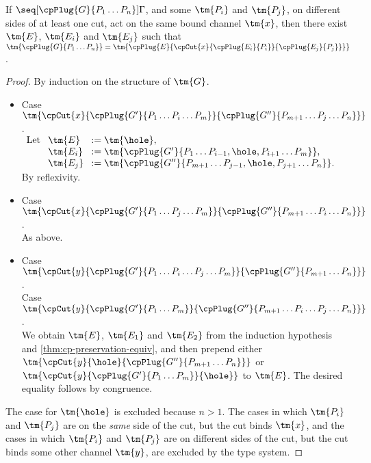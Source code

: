 \begin{lemma}\label{lem:cp-progress-beta}
  If $\seq[{ \cpPlug{G}{P_1 \dots P_n} }]{ \Gamma }$, and some $\tm{P_i}$ and
  $\tm{P_j}$, on different sides of at least one cut, act on the same bound
  channel $\tm{x}$, then there exist $\tm{E}$, $\tm{E_i}$ and $\tm{E_j}$ such that 
  \(
  \tm{\cpPlug{G}{P_1 \dots P_n}} =
  \tm{\cpPlug{E}{\cpCut{x}{\cpPlug{E_i}{P_i}}{\cpPlug{E_j}{P_j}}}}
  \).
\end{lemma}
\begin{proof}
  By induction on the structure of $\tm{G}$.
  \begin{itemize}
  \item
    Case $\tm{\cpCut{x}{\cpPlug{G'}{P_1\dots P_i\dots P_m}}{\cpPlug{G''}{P_{m+1}\dots P_j\dots P_n}}}$. 
    \\
    \(
    \arraycolsep=4pt
    \begin{array}[t]{lll}
      \text{Let}& \tm{E}   &:= \tm{\hole}, \\
                & \tm{E_i} &:= \tm{\cpPlug{G'}{P_1\dots P_{i-1},\hole,P_{i+1}\dots P_m}}, \\
                & \tm{E_j} &:= \tm{\cpPlug{G''}{P_{m+1}\dots P_{j-1},\hole,P_{j+1}\dots P_n}}.
    \end{array}
    \)
    \\[1ex]
    By reflexivity.
  \item
    Case $\tm{\cpCut{x}{\cpPlug{G'}{P_1\dots P_j\dots P_m}}{\cpPlug{G''}{P_{m+1}\dots P_i\dots P_n}}}$.
    \\
    As above.
  \item
    Case $\tm{\cpCut{y}{\cpPlug{G'}{P_1\dots P_i\dots P_j\dots P_m}}{\cpPlug{G''}{P_{m+1}\dots P_n}}}$. \\
    Case $\tm{\cpCut{y}{\cpPlug{G'}{P_1\dots P_m}}{\cpPlug{G''}{P_{m+1}\dots P_i\dots P_j\dots P_n}}}$.
    \\
    We obtain $\tm{E}$, $\tm{E_1}$ and $\tm{E_2}$ from the induction hypothesis and
    \cref{thm:cp-preservation-equiv}, and then prepend either
    $\tm{\cpCut{y}{\hole}{\cpPlug{G''}{P_{m+1}\dots P_n}}}$ or
    $\tm{\cpCut{y}{\cpPlug{G'}{P_1\dots P_m}}{\hole}}$ to $\tm{E}$.
    The desired equality follows by congruence.
  \end{itemize}
  The case for $\tm{\hole}$ is excluded because $n > 1$.
  The cases in which $\tm{P_i}$ and $\tm{P_j}$ are on the \emph{same} side of the
  cut, but the cut binds $\tm{x}$, and the cases in which $\tm{P_i}$ and $\tm{P_j}$
  are on different sides of the cut, but the cut binds some other channel
  $\tm{y}$, are excluded by the type system.
\end{proof}
